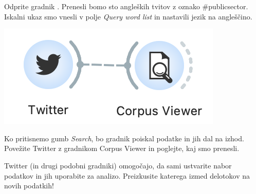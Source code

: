 Odprite gradnik . Prenesli bomo sto angleških tvitov z oznako \#publicsector. Iskalni ukaz smo vnesli v polje \textit{Query word list} in nastavili jezik na angleščino.

\begin{marginfigure}[0cm]
    \includegraphics[width=\linewidth]{twitter-workflow.png}
    \caption{}
\end{marginfigure}

Ko pritisnemo gumb \textit{Search}, bo gradnik poiskal podatke in jih dal na izhod. Povežite Twitter z gradnikom Corpus Viewer in poglejte, kaj smo prenesli.

Twitter (in drugi podobni gradniki) omogočajo, da sami ustvarite nabor podatkov in jih uporabite za analizo. Preizkusite katerega izmed delotokov na novih podatkih!

